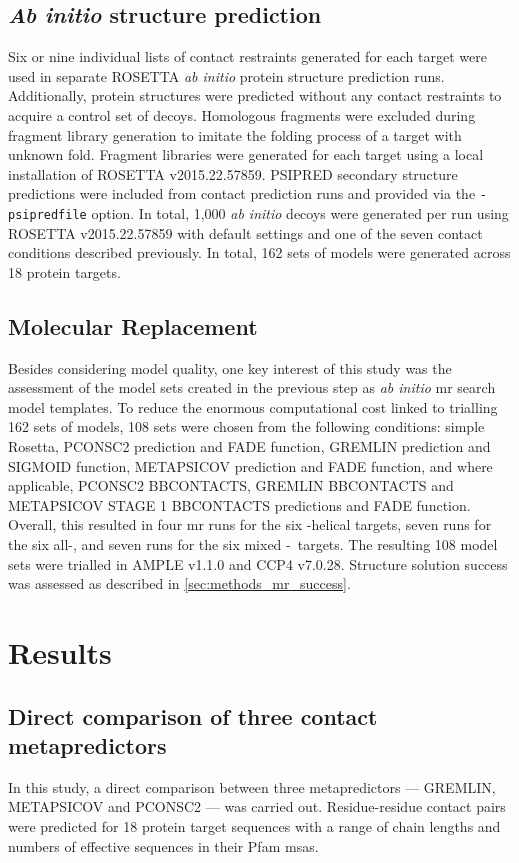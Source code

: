 \subsection{\textit{Ab initio} structure prediction}
Six or nine individual lists of contact restraints generated for each target were used in separate ROSETTA \textit{ab initio} protein structure prediction runs. Additionally, protein structures were predicted without any contact restraints to acquire a control set of decoys. Homologous fragments were excluded during fragment library generation to imitate the folding process of a target with unknown fold. Fragment libraries were generated for each target using a local installation of ROSETTA v2015.22.57859. PSIPRED secondary structure predictions were included from contact prediction runs and provided via the \texttt{-psipredfile} option. In total, 1,000 \textit{ab initio} decoys were generated per run using ROSETTA v2015.22.57859 with default settings \cite{Rohl2004-dj} and one of the seven contact conditions described previously. In total, 162 sets of models were generated across 18 protein targets.

\subsection{Molecular Replacement}
Besides considering model quality, one key interest of this study was the assessment of the model sets created in the previous step as \textit{ab initio} \gls{mr} search model templates. To reduce the enormous computational cost linked to trialling 162 sets of models, 108 sets were chosen from the following conditions: simple Rosetta, PCONSC2 prediction and FADE function, GREMLIN prediction and SIGMOID function, METAPSICOV prediction and FADE function, and where applicable, PCONSC2 BBCONTACTS, GREMLIN BBCONTACTS and METAPSICOV STAGE 1 BBCONTACTS predictions and FADE function. Overall, this resulted in four \gls{mr} runs for the six \textalpha-helical targets, seven runs for the six all-\textbeta, and seven runs for the six mixed \textalpha-\textbeta\ targets. The resulting 108 model sets were trialled in AMPLE v1.1.0 and CCP4 v7.0.28. Structure solution success was assessed as described in \cref{sec:methods_mr_success}.

\section{Results}
\subsection{Direct comparison of three contact metapredictors}
In this study, a direct comparison between three metapredictors --- GREMLIN, METAPSICOV and PCONSC2 --- was carried out. Residue-residue contact pairs were predicted for 18 protein target sequences with a range of chain lengths and numbers of effective sequences in their Pfam \gls{msa}s.

